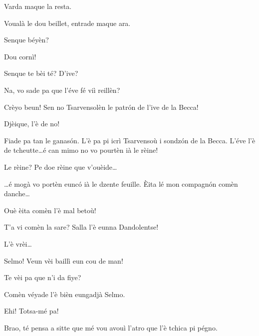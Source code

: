 \begin{drama}

\Pinospeaks{} Varda maque la resta.

\Dorinaspeaks Voualà le dou beillet, entrade maque ara.


\Pinospeaks{} Senque béyèn?

\Geppinospeaks{} Dou cornì!


\Pinospeaks {} Senque te bèi té? D'ive? 

\Walterspeaks	Na, vo sade pa que l'éve fé viì reillèn?

\Pinospeaks	Crèyo beun! Sen no Tsarvensolèn le patr\'on de l'ive de la Becca!

\Geppinospeaks{} Djèique, l'è de no!

\Walterspeaks	Fiade pa tan le ganas\'on. L'è pa pi icrì Tsarvensoù i sondz\'on de la Becca. L'éve l'è de tcheutte\ldots é can mimo no vo pourtèn ià le rèine!

\Pinospeaks Le rèine? Pe doe rèine que v'ouèide\ldots

\Walterspeaks \ldots é mogà vo portèn eunc\'o ià le dzente feuille.  \`Eita lé mon compagn\'on comèn danche\ldots

\Pinospeaks Ouè èita comèn l'è mal betoù!

\Walterspeaks T'a vi comèn la sare? Salla l'è eunna Dandolentse!

\Pinospeaks{} L'è vrèi\ldots

\Walterspeaks Selmo! Veun vèi baillì eun cou de man!
 
\Selmospeaks	Te vèi pa que n'i da fiye?

\Walterspeaks{} Comèn véyade l'è bièn eungadjà Selmo.


\Pinospeaks{} Ehi! Totsa-mé pa!


\Pinospeaks Brao, té pensa a sitte que mé vou avouì l'atro que l'è tchica pi pégno.


\end{drama}
